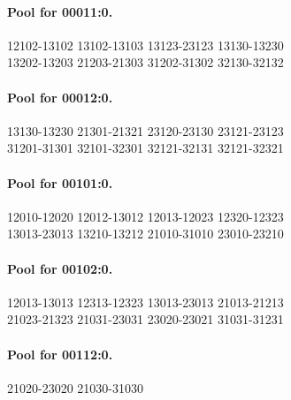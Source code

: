 \documentclass[11pt]{article}
\numberwithin{equation}{section}
\numberwithin{table}{section}
\begin{document}
\paragraph{Pool for 00011:0.}
\begingroup\footnotesize\ttfamily\begin{flushleft}
12102-13102 13102-13103 13123-23123 13130-13230\\
13202-13203 21203-21303 31202-31302 32130-32132\\
\end{flushleft}\endgroup
\paragraph{Pool for 00012:0.}
\begingroup\footnotesize\ttfamily\begin{flushleft}
13130-13230 21301-21321 23120-23130 23121-23123\\
31201-31301 32101-32301 32121-32131 32121-32321\\
\end{flushleft}\endgroup
\paragraph{Pool for 00101:0.}
\begingroup\footnotesize\ttfamily\begin{flushleft}
12010-12020 12012-13012 12013-12023 12320-12323\\
13013-23013 13210-13212 21010-31010 23010-23210\\
\end{flushleft}\endgroup
\paragraph{Pool for 00102:0.}
\begingroup\footnotesize\ttfamily\begin{flushleft}
12013-13013 12313-12323 13013-23013 21013-21213\\
21023-21323 21031-23031 23020-23021 31031-31231\\
\end{flushleft}\endgroup
\paragraph{Pool for 00112:0.}
\begingroup\footnotesize\ttfamily\begin{flushleft}
21020-23020 21030-31030\\
\end{flushleft}\endgroup
\end{document}
